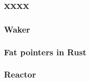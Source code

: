 \subsection{xxxx} %
\begin{frame}[fragile]
    \frametitle{Waker}
\end{frame}
% 
% 
% 
% 
% 
\begin{frame}[fragile]
    \frametitle{Fat pointers in Rust}
\end{frame}
% 
% 
% 
% 
% 
% 
% 
% 
% 
% 
\begin{frame}[fragile]
    \frametitle{Reactor}
\end{frame}
